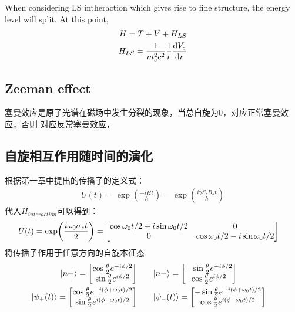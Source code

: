 \documentclass[UTF8]{article}
\numberwithin{equation}{section}
\begin{document}
When considering LS intheraction which gives rise to fine 
structure, the energy level will split. At this point,
\begin{align*}
    H = T+V+H_{LS}\\
    H_{LS} = \frac{1}{m^2_e c^2}\frac{1}{r}\dv{V_c}{r}(L\cdot S)
\end{align*}
\subsection{Zeeman effect}
塞曼效应是原子光谱在磁场中发生分裂的现象，当总自旋为0，对应正常塞曼效应，否则
对应反常塞曼效应，

\subsection{自旋相互作用随时间的演化}
根据第一章中提出的传播子的定义式：
\begin{align*}
    U(t)= \exp(\frac{-iHt}{\hbar})=\exp(\frac{i\gamma S_z B_k t}{\hbar})
\end{align*}
代入$H_{interaction}$可以得到：
\begin{align*}
      & U(t)=\exp (\frac{i\omega_0 \sigma_z t}{2})=\mqty[\cos {\omega_0t/2}+i\sin{\omega_0t/2} & 0 \\
    0 & \cos {\omega_0t/2}-i\sin{\omega_0t/2}]
\end{align*}
将传播子作用于任意方向的自旋本征态
\begin{align*}
    \begin{split}
        \ket{n+} &= \mqty[\cos{\frac{\theta}{2}}e^{-i\phi/2 } \\ \sin{\frac{\theta}{2}}e^{i\phi/2 }]
    \end{split}
    \quad &
    \begin{split}
        \ket{n-} &= \mqty[-\sin{\frac{\theta}{2}}e^{-i\phi/2 } \\ \cos{\frac{\theta}{2}}e^{i\phi/2} ]
    \end{split} \\
    \begin{split}
        \ket{\psi_+(t)} &= \mqty[\cos{\frac{\theta}{2}}e^{-i(\phi+\omega_0 t)/2 }\\\sin{\frac{\theta}{2}}e^{i(\phi-\omega_0t)/2 }]
    \end{split}
    \quad &
    \begin{split}
        \ket{\psi_-(t)} &= \mqty[-\sin{\frac{\theta}{2}}e^{-i(\phi+\omega_0 t)/2}\\\cos{\frac{\theta}{2}}e^{i(\phi-\omega_0t)/2 }]
    \end{split}
\end{align*}
\end{document}
